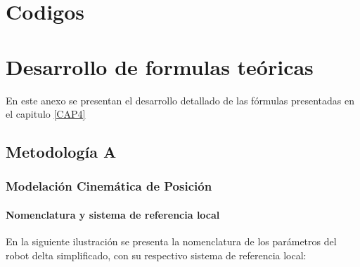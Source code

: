 \chapter{Codigos}\label{anexoA}
\thispagestyle{fancy}
    \section{}
        \subsection{}
        
        
        
\chapter{Desarrollo de formulas teóricas}\label{anexoB}
\thispagestyle{fancy}
    En este anexo se presentan el desarrollo detallado de las fórmulas presentadas en el capitulo \ref{CAP4} 
    
    
    \section{Metodología A}
        \subsection{Modelación Cinemática de Posición}
        
        \subsubsection{Nomenclatura y sistema de referencia local}
        En la siguiente ilustración se presenta la nomenclatura de los parámetros del robot delta simplificado, con su respectivo sistema de referencia local:
        
